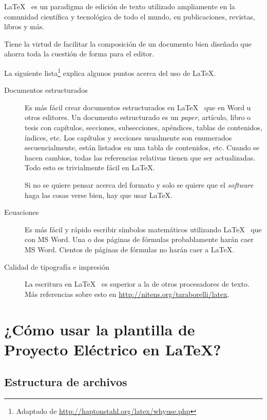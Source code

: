 \LaTeX~ es un paradigma de edición de texto utilizado ampliamente en la comunidad científica y tecnológica de todo el mundo, en publicaciones, revistas, libros y más. 

Tiene la virtud de facilitar la composición de un documento bien diseñado que ahorra toda la cuestión de forma para el editor.

La siguiente lista\footnote{Adaptado de \url{http://haptonstahl.org/latex/whyuse.php}} explica algunos puntos acerca del uso de \LaTeX.

\begin{description}

\item[Documentos estructurados] 
Es más fácil crear documentos estructurados en \LaTeX~ que en Word u otros editores. Un documento estructurado es un \emph{paper}, artículo, libro o tesis con capítulos, secciones, subsecciones, apéndices, tablas de contenidos, índices, etc. Los capítulos y secciones usualmente son enumerados secuencialmente, están listados en una tabla de contenidos, etc. Cuando se hacen cambios, todas las referencias relativas tienen que ser actualizadas. Todo esto es trivialmente fácil en \LaTeX.

Si no se quiere pensar acerca del formato y solo se quiere que el \emph{software} haga las cosas verse bien, hay que usar \LaTeX.

\item[Ecuaciones] 
Es más fácil y rápido escribir símbolos matemáticos utilizando \LaTeX~ que con MS Word. Una o dos páginas de fórmulas probablamente harán caer MS Word. Cientos de páginas de fórmulas no harán caer a \LaTeX.

\item[Calidad de tipografía e impresión] 
La escritura en \LaTeX~ es superior a la de otros procesadores de texto. Más referencias sobre esto en \url{http://nitens.org/taraborelli/latex}.

\end{description}

\section{¿Cómo usar la plantilla de Proyecto Eléctrico en \LaTeX?}

\subsection{Estructura de archivos}
\label{S:estructura_archivos}

